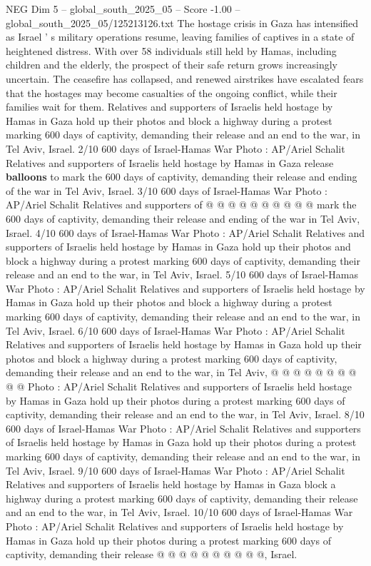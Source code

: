 \begin{textsample}{NEG Dim 5 – global\_south\_2025\_05 – Score -1.00 – global\_south\_2025\_05/125213126.txt}  \label{ex:f5_neg_260}
The hostage crisis in Gaza has intensified as Israel ' s military operations resume, leaving families of captives in a state of heightened distress.
With over 58 individuals still held by Hamas, including children and the elderly, the prospect of their safe return grows increasingly uncertain.
The ceasefire has collapsed, and renewed airstrikes have escalated fears that the hostages may become casualties of the ongoing conflict, while their families wait for them.
Relatives and supporters of Israelis held hostage by Hamas in Gaza hold up their photos and block a highway during a protest marking 600 days of captivity, demanding their release and an end to the war, in Tel Aviv, Israel. 2/10 600 days of Israel-Hamas War Photo : AP/Ariel Schalit Relatives and supporters of Israelis held hostage by Hamas in Gaza release \textbf{balloons} to mark the 600 days of captivity, demanding their release and ending of the war in Tel Aviv, Israel. 3/10 600 days of Israel-Hamas War Photo : AP/Ariel Schalit Relatives and supporters of @ @ @ @ @ @ @ @ @ @ mark the 600 days of captivity, demanding their release and ending of the war in Tel Aviv, Israel. 4/10 600 days of Israel-Hamas War Photo : AP/Ariel Schalit Relatives and supporters of Israelis held hostage by Hamas in Gaza hold up their photos and block a highway during a protest marking 600 days of captivity, demanding their release and an end to the war, in Tel Aviv, Israel. 5/10 600 days of Israel-Hamas War Photo : AP/Ariel Schalit Relatives and supporters of Israelis held hostage by Hamas in Gaza hold up their photos and block a highway during a protest marking 600 days of captivity, demanding their release and an end to the war, in Tel Aviv, Israel. 6/10 600 days of Israel-Hamas War Photo : AP/Ariel Schalit Relatives and supporters of Israelis held hostage by Hamas in Gaza hold up their photos and block a highway during a protest marking 600 days of captivity, demanding their release and an end to the war, in Tel Aviv, @ @ @ @ @ @ @ @ @ @ Photo : AP/Ariel Schalit Relatives and supporters of Israelis held hostage by Hamas in Gaza hold up their photos during a protest marking 600 days of captivity, demanding their release and an end to the war, in Tel Aviv, Israel. 8/10 600 days of Israel-Hamas War Photo : AP/Ariel Schalit Relatives and supporters of Israelis held hostage by Hamas in Gaza hold up their photos during a protest marking 600 days of captivity, demanding their release and an end to the war, in Tel Aviv, Israel. 9/10 600 days of Israel-Hamas War Photo : AP/Ariel Schalit Relatives and supporters of Israelis held hostage by Hamas in Gaza block a highway during a protest marking 600 days of captivity, demanding their release and an end to the war, in Tel Aviv, Israel. 10/10 600 days of Israel-Hamas War Photo : AP/Ariel Schalit Relatives and supporters of Israelis held hostage by Hamas in Gaza hold up their photos during a protest marking 600 days of captivity, demanding their release @ @ @ @ @ @ @ @ @ @, Israel.

\end{textsample}

